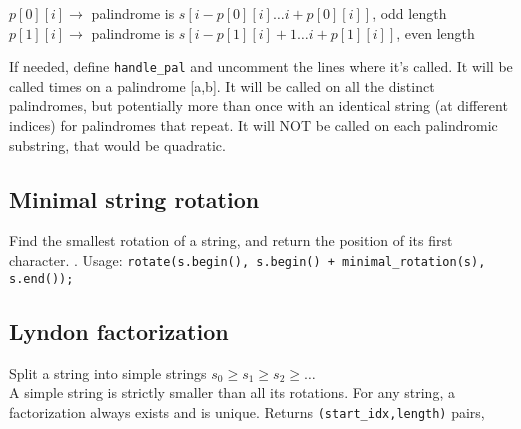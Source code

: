 \begin{flushleft}
$p[0][i] \xrightarrow{}$ palindrome is $s[i-p[0][i] \ldots i+p[0][i]]$, odd length \\
$p[1][i] \xrightarrow{}$ palindrome is $s[i-p[1][i]+1 \ldots i+p[1][i]]$, even length
\end{flushleft}

If needed, define \texttt{handle\_pal} and uncomment the lines where it's called. It will be called  times on a palindrome [a,b]. It will be called on all the distinct palindromes, but potentially more than once with an identical string (at different indices) for palindromes that repeat. It will NOT be called on each palindromic substring, that would be quadratic.

\subsection{Minimal string rotation}
Find the smallest rotation of a string, and return the position of its first character. . Usage:
\texttt{rotate(s.begin(), s.begin() + minimal\_rotation(s), s.end());}

\subsection{Lyndon factorization}
Split a string into simple strings $s_0 \geq s_1 \geq s_2 \geq \ldots $\\
A simple string is strictly smaller than all its rotations. For any string, a factorization always exists and is unique. Returns \texttt{(start\_idx,length)} pairs, 

